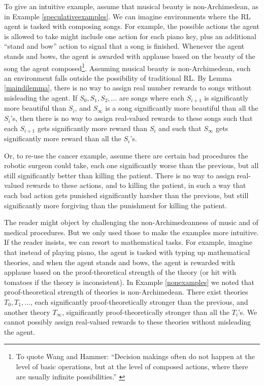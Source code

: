 \documentclass[reqno]{article}
\theoremstyle{definition}
\begin{document}
To give an intuitive example, assume that musical beauty is non-Archimedean,
as in Example \ref{speculativeexamples}. We can imagine environments where the
RL agent is tasked with composing songs. For example, the possible actions the
agent is allowed to take might include one action for each piano key, plus
an additional ``stand and bow'' action to signal that a song is
finished.
Whenever the agent stands and bows, the agent is awarded with applause based on
the beauty of the song the agent
composed\footnote{To quote Wang and Hammer: ``Decision makings often do not happen
at the level of basic operations, but at the level of composed actions, where
there are usually infinite possibilities.'' \cite{wang2015assumptions}}. Assuming
musical beauty is
non-Archimedean, such an environment falls outside the possibility of traditional
RL. By Lemma \ref{maindilemma}, there is no way to assign real number
rewards to songs without misleading the agent. If $S_0,S_1,S_2,\ldots$ are songs
where each $S_{i+1}$ is significantly more beautiful than $S_i$, and $S_\infty$
is a song significantly more beautiful than all the $S_i$'s, then there is no way to
assign real-valued rewards to these songs such that each $S_{i+1}$ gets
significantly more reward than $S_i$ and such that $S_\infty$ gets significantly
more reward than all the $S_i$'s.

Or, to re-use the cancer example, assume there are certain bad procedures the
robotic surgeon could take, each one significantly worse than the previous,
but all still significantly better than killing the patient. There is no way
to assign real-valued rewards to these actions, and to killing the patient,
in such a way that each bad action gets punished significantly harsher than
the previous, but still significantly more forgiving than the punishment for
killing the patient.

The reader might object by challenging the non-Archimedeanness
of music and of medical procedures. But we only used those to make the examples
more intuitive. If the reader insists, we can resort to mathematical tasks.
For example, imagine that instead of playing piano, the agent is tasked with
typing up mathematical theories, and when the agent stands and bows, the agent
is rewarded with applause based on the proof-theoretical strength of the theory
(or hit with tomatoes if the theory is inconsistent).
In Example \ref{nonexamples} we noted that proof-theoretical strength of theories
is non-Archimedean. There exist theories $T_0,T_1,\ldots$, each significantly
proof-theoretically stronger than the previous, and another theory $T_\infty$,
significantly proof-theoretically stronger than all the $T_i$'s. We cannot
possibly assign real-valued rewards to these theories without misleading the
agent.
\end{document}
